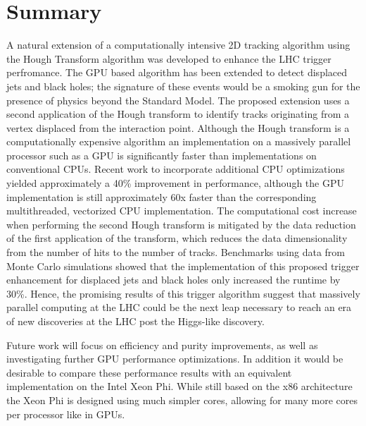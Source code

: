 \documentclass{JINST}
\begin{document}
\section{Summary}

A natural extension of a computationally intensive 2D tracking algorithm using the Hough Transform algorithm was developed to enhance the LHC trigger perfromance.
The GPU based algorithm has been extended to detect displaced jets and black holes; the signature of these events would be a smoking gun for the presence of physics beyond the Standard Model.  The proposed extension uses 
a second application of the Hough transform to identify tracks originating from a vertex displaced from the interaction point.  Although the Hough transform is a 
computationally expensive algorithm an implementation on a massively parallel processor such as a GPU is significantly faster than implementations on conventional CPUs.  Recent work to incorporate additional CPU optimizations yielded approximately a 40\% improvement in performance, although the GPU implementation is still approximately 60x faster 
than the corresponding multithreaded, vectorized CPU implementation.  The computational cost increase when performing the second Hough transform is mitigated by the data reduction of the first application of the transform, which reduces the data dimensionality from the number of hits to the number of tracks.  Benchmarks using data from Monte Carlo simulations showed that the implementation of this proposed trigger enhancement for displaced jets and black holes only increased the runtime by 30\%. Hence, the promising results of this trigger algorithm suggest that massively parallel computing at the LHC could be the next leap necessary 
to reach an era of new discoveries at the LHC post the Higgs-like discovery. 

Future work will focus on efficiency and purity improvements, as well as investigating further GPU performance optimizations.  In addition it would be desirable to compare these performance results with an equivalent implementation on the Intel Xeon Phi.  While still based on the x86 architecture the Xeon Phi is designed using much simpler cores, allowing for many more cores per processor like in GPUs.
\end{document}
